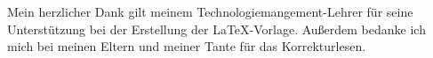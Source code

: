 \begin{danksagung}
Mein herzlicher Dank gilt meinem Technologiemangement-Lehrer für seine  Unterstützung bei der Erstellung der \LaTeX-Vorlage. Außerdem bedanke ich mich bei meinen Eltern und meiner Tante für das Korrekturlesen.
\end{danksagung}